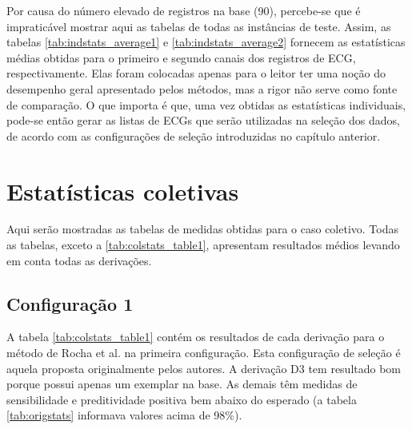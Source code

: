 
Por causa do número elevado de registros na base (90), percebe-se que é impraticável mostrar aqui as tabelas de todas as instâncias de teste. Assim, as tabelas \ref{tab:indstats_average1} e \ref{tab:indstats_average2} fornecem as estatísticas médias obtidas para o primeiro e segundo canais dos registros de ECG, respectivamente. Elas foram colocadas apenas para o leitor ter uma noção do desempenho geral apresentado pelos métodos, mas a rigor não serve como fonte de comparação. O que importa é que, uma vez obtidas as estatísticas individuais, pode-se então gerar as listas de ECGs que serão utilizadas na seleção dos dados, de acordo com as configurações de seleção introduzidas no capítulo anterior.



\section{Estatísticas coletivas}

Aqui serão mostradas as tabelas de medidas obtidas para o caso coletivo. Todas as tabelas, exceto a \ref{tab:colstats_table1}, apresentam resultados médios levando em conta todas as derivações.

\subsection*{Configuração 1}
A tabela \ref{tab:colstats_table1} contém os resultados de cada derivação para o método de Rocha et al. na primeira configuração. Esta configuração de seleção é aquela proposta originalmente pelos autores. A derivação D3 tem resultado bom porque possui apenas um exemplar na base. As demais têm medidas de sensibilidade e preditividade positiva bem abaixo do esperado (a tabela \ref{tab:origstats} informava valores acima de 98\%).

